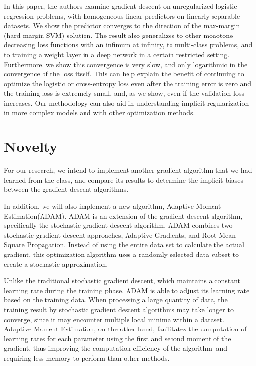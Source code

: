In this paper, the authors examine gradient descent on unregularized logistic regression problems, with homogeneous linear predictors on linearly separable datasets. We show the predictor converges to the direction of the max-margin (hard margin SVM) solution. The result also generalizes to other monotone decreasing loss functions with an infimum at infinity, to multi-class problems, and to training a weight layer in a deep network in a certain restricted setting. Furthermore, we show this convergence is very slow, and only logarithmic in the convergence of the loss itself. This can help explain the benefit of continuing to optimize the logistic or cross-entropy loss even after the training error is zero and the training loss is extremely small, and, as we show, even if the validation loss increases. Our methodology can also aid in understanding implicit regularization in more complex models and with other optimization methods.

\section{Novelty}

For our research, we intend to implement another gradient algorithm that we had learned from the class, and compare its results to determine the implicit biases between the gradient descent algorithms.

In addition, we will also implement a new algorithm, Adaptive Moment Estimation(ADAM). ADAM is an extension of the gradient descent algorithm, specifically the stochastic gradient descent algorithm. ADAM combines two stochastic gradient descent approaches, Adaptive Gradients, and Root Mean Square Propagation. Instead of using the entire data set to calculate the actual gradient, this optimization algorithm uses a randomly selected data subset to create a stochastic approximation.

Unlike the traditional stochastic gradient descent, which maintains a constant learning rate during the training phase, ADAM is able to adjust its learning rate based on the training data. When processing a large quantity of data, the training result by stochastic gradient descent algorithms may take longer to converge, since it may encounter multiple local minima within a dataset. Adaptive Moment Estimation, on the other hand, facilitates the computation of learning rates for each parameter using the first and second moment of the gradient, thus improving the computation efficiency of the algorithm, and requiring less memory to perform than other methods. 

